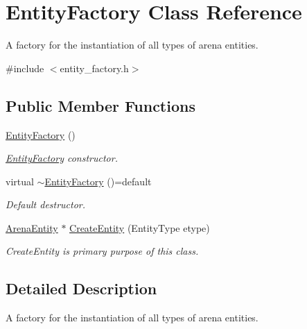 \hypertarget{classEntityFactory}{}\section{Entity\+Factory Class Reference}
\label{classEntityFactory}


A factory for the instantiation of all types of arena entities.  




{\ttfamily \#include $<$entity\+\_\+factory.\+h$>$}

\subsection*{Public Member Functions}
\begin{DoxyCompactItemize}
\item 
\hyperlink{classEntityFactory_abaf0c4ceaa682e55f69b0ceae230008a}{Entity\+Factory} ()\hypertarget{classEntityFactory_abaf0c4ceaa682e55f69b0ceae230008a}{}\label{classEntityFactory_abaf0c4ceaa682e55f69b0ceae230008a}

\begin{DoxyCompactList}\small\item\em \hyperlink{classEntityFactory}{Entity\+Factory} constructor. \end{DoxyCompactList}\item 
virtual \hyperlink{classEntityFactory_ae3246f06fa101178803f76582323d4ad}{$\sim$\+Entity\+Factory} ()=default\hypertarget{classEntityFactory_ae3246f06fa101178803f76582323d4ad}{}\label{classEntityFactory_ae3246f06fa101178803f76582323d4ad}

\begin{DoxyCompactList}\small\item\em Default destructor. \end{DoxyCompactList}\item 
\hyperlink{classArenaEntity}{Arena\+Entity} $\ast$ \hyperlink{classEntityFactory_abf7b1ac4ec275728b47c37fcd85f81e8}{Create\+Entity} (Entity\+Type etype)
\begin{DoxyCompactList}\small\item\em Create\+Entity is primary purpose of this class. \end{DoxyCompactList}\end{DoxyCompactItemize}


\subsection{Detailed Description}
A factory for the instantiation of all types of arena entities. 

